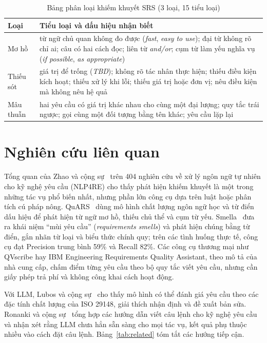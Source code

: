 \documentclass[12pt,a4paper]{report}
\begin{document}
\begin{table}[H]
\centering
\caption{Bảng phân loại khiếm khuyết SRS (3 loại, 15 tiểu loại)}
\label{tab:taxonomy}
\small
\begin{tabular}{p{2.4cm}p{12.2cm}}
\toprule
\textbf{Loại} & \textbf{Tiểu loại và dấu hiệu nhận biết} \\
\midrule
Mơ hồ & từ ngữ chủ quan không đo được (\textit{fast}, \textit{easy to use}); đại từ không rõ chỉ ai; câu có hai cách đọc; liên từ \textit{and/or}; cụm từ làm yếu nghĩa vụ (\textit{if possible}, \textit{as appropriate}) \\
\midrule
Thiếu sót & giá trị để trống (\textit{TBD}); không rõ tác nhân thực hiện; thiếu điều kiện kích hoạt; thiếu xử lý khi lỗi; thiếu giá trị hoặc đơn vị; nêu điều kiện mà không nêu hệ quả \\
\midrule
Mâu thuẫn & hai yêu cầu có giá trị khác nhau cho cùng một đại lượng; quy tắc trái ngược; gọi cùng một đối tượng bằng tên khác; yêu cầu lặp lại \\
\bottomrule
\end{tabular}
\end{table}

\section{Nghiên cứu liên quan}
Tổng quan của Zhao và cộng sự~\cite{zhao2021} trên 404 nghiên cứu về xử lý ngôn ngữ tự nhiên cho kỹ nghệ yêu cầu (NLP4RE) cho thấy phát hiện khiếm khuyết là một trong những tác vụ phổ biến nhất, nhưng phần lớn công cụ dựa trên luật hoặc phân tích cú pháp nông. QuARS~\cite{fabbrini2001,fabbrini2005} dùng mô hình chất lượng ngôn ngữ học và từ điển dấu hiệu để phát hiện từ ngữ mơ hồ, thiếu chủ thể và cụm từ yếu. Smella~\cite{femmer2017} đưa ra khái niệm ``mùi yêu cầu'' (\textit{requirements smells}) và phát hiện chúng bằng từ điển, gắn nhãn từ loại và biểu thức chính quy; trên các tình huống thực tế, công cụ đạt Precision trung bình 59\% và Recall 82\%. Các công cụ thương mại như QVscribe hay IBM Engineering Requirements Quality Assistant, theo mô tả của nhà cung cấp, chấm điểm từng yêu cầu theo bộ quy tắc viết yêu cầu, nhưng cần giấy phép trả phí và không công khai cách hoạt động.

Với LLM, Lubos và cộng sự~\cite{lubos2024} cho thấy mô hình có thể đánh giá yêu cầu theo các đặc tính chất lượng của ISO 29148, giải thích nhận định và đề xuất bản sửa. Ronanki và cộng sự~\cite{ronanki2025} tổng hợp các hướng dẫn viết câu lệnh cho kỹ nghệ yêu cầu và nhận xét rằng LLM chưa hẳn sẵn sàng cho mọi tác vụ, kết quả phụ thuộc nhiều vào cách đặt câu lệnh. Bảng~\ref{tab:related} tóm tắt các hướng tiếp cận.
\end{document}
